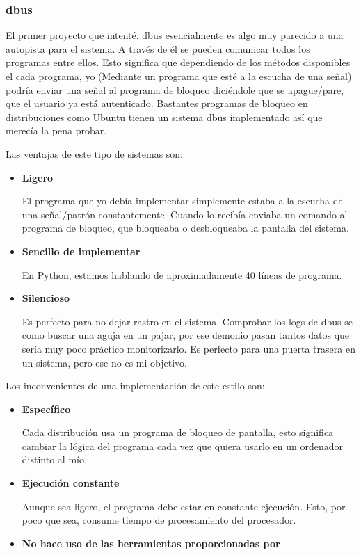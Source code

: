 \documentclass[titlepage, 12pt, a4paper]{article}
\begin{document}
{\subsubsection{\gls{dbus}}
El primer proyecto que intenté. \gls{dbus} esencialmente es algo muy parecido a una autopista para el sistema. A través de él se pueden comunicar todos los programas entre ellos. Esto significa que dependiendo de los métodos disponibles el cada programa, yo (Mediante un programa que esté a la escucha de una señal) podría enviar una señal al programa de bloqueo diciéndole que se apague/pare, que el usuario ya está autenticado. Bastantes programas de bloqueo en distribuciones como \gls{Ubuntu} tienen un sistema \gls{dbus} implementado así que merecía la pena probar.\par
Las ventajas de este tipo de sistemas son:
\begin{itemize}
	\item{\textbf{Ligero}}\par
		El programa que yo debía implementar simplemente estaba a la escucha de una señal/patrón constantemente. Cuando lo recibía enviaba un comando al programa de bloqueo, que bloqueaba o desbloqueaba la pantalla del sistema. 
	\item{\textbf{Sencillo de implementar}}\par
		En Python, estamos hablando de aproximadamente 40 líneas de programa.
	\item{\textbf{Silencioso}}\par
		Es perfecto para no dejar rastro en el sistema. Comprobar los logs de \gls{dbus} se como buscar una aguja en un pajar, por ese demonio pasan tantos datos que sería muy poco práctico monitorizarlo. Es perfecto para una puerta trasera en un sistema, pero ese no es mi objetivo.
\end{itemize}
Los inconvenientes de una implementación de este estilo son:
\begin{itemize}
	\item{\textbf{Específico}}\par
		Cada distribución usa un programa de bloqueo de pantalla, esto significa cambiar la lógica del programa cada vez que quiera usarlo en un ordenador distinto al mío.
	\item{\textbf{Ejecución constante}}\par
		Aunque sea ligero, el programa debe estar en constante ejecución. Esto, por poco que sea, consume tiempo de procesamiento del procesador.
	\item{\textbf{No hace uso de las herramientas proporcionadas por }\par
}
\end{itemize}}
\end{document}
